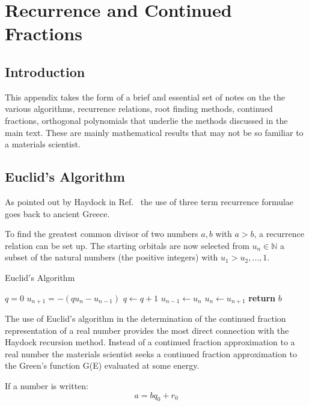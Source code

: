 \chapter{Recurrence and Continued Fractions}
\section{Introduction}
This appendix takes the form of a brief and essential
set of notes on the the various algorithms, recurrence relations,
root finding methods, continued fractions, orthogonal polynomials that 
underlie the methods discussed in the main text. 
These are mainly mathematical results
that may not be so familiar to a materials scientist.

\section{Euclid's Algorithm}
As pointed out by Haydock in Ref.~\cite{weaire85} the 
use of three term recurrence formulae goes back to 
ancient Greece. 

To find the greatest common divisor of two numbers $a,b$ with
$a>b$, a recurrence relation can be set up. The starting orbitals are now 
selected from ${u_{n}}\in\mathbb{N}$ a subset of the 
natural numbers (the positive integers) with ${u_1>u_2,...,1}$.

\begin{algorithm}
\caption{Euclid$'$s Algorithm}\label{alg:euclid}
\begin{algorithmic}[1]
\State $q = 0$
\State $u_{n+1} = -(qu_{n} - u_{n-1})$
\State $q \gets q+1$
\EndWhile\label{quotientwhile}
\State $u_{n-1} \gets u_{n}$
\State $u_{n} \gets u_{n+1}$
\EndWhile\label{euclidendwhile}
\State \textbf{return} $b$
\EndProcedure
\end{algorithmic}
\end{algorithm}

The use of Euclid's algorithm in the determination of 
the continued fraction representation of a real number
provides the most direct connection with the Haydock recursion
method. Instead of a continued fraction approximation to a real
number the materials scientist seeks a continued fraction
approximation to the Green's function G(E) evaluated 
at some energy.

If a number is written:
\begin{equation}
a=bq_{0} + r_{0}
\end{equation}

